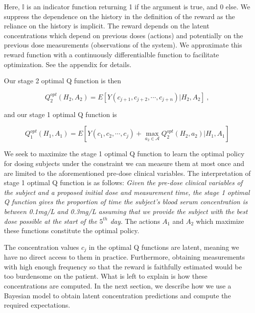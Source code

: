 \noindent Here, $ \mathbb{I} $ is an indicator function returning 1 if the argument is true, and 0 else.  
%
We suppress the dependence on the history in the definition of the reward as the reliance on the history is implicit.  The reward depends on the latent concentrations which depend on previous doses (actions) and potentially on the previous dose measurements (observations of the system).  We approximate this reward function with a continuously differentialble function to facilitate optimization.  See the appendix for details.  


Our stage 2 optimal Q function is then

\begin{equation}
Q_{2}^{o p t}\left(H_{2}, A_{2}\right)=E\left[Y\left(c_{j+1}, c_{j+2}, \cdots, c_{j+n}\right) \Bigg\vert H_{2}, A_{2}\right] \>,
\end{equation}

\noindent and our stage 1 optimal Q function is

\begin{equation}
Q_{1}^{o p t}\left(H_{1}, A_{1}\right)= E \left[Y\left(c_{1}, c_{2}, \cdots, c_{j}\right)+\max _{a_{2} \in \mathscr{A}} Q_{2}^{o p t}\left(H_{2}, a_{2}\right) \Bigg\vert H_{1}, A_{1}\right]
\end{equation}

We seek to maximize the stage 1 optimal Q function to learn the optimal policy for dosing subjects under the constraint we can measure them at most once and are limited to the aforementioned pre-dose clinical variables.  The interpretation of stage 1 optimal Q function is as follows:\textit{ Given the pre-dose clinical variables of the subject and a proposed initial dose and measurement time, the stage 1 optimal Q function gives the proportion of time the subject’s blood serum concentration is between 0.1mg/L and 0.3mg/L assuming that we provide the subject with the best dose possible at the start of the $ 5^{th} $ day.}  The actions $ A_1 $ and $ A_2 $ which maximize these functions constitute the optimal policy.

The concentration values $ c_j $ in the optimal Q functions are latent, meaning we have no direct access to them in practice. Furthermore, obtaining measurements with high enough frequency so that the reward is faithfully estimated would be too burdensome on the patient. What is left to explain is how these concentrations are computed. In the next section, we describe how we use a Bayesian model  to obtain latent concentration predictions and compute the required expectations.